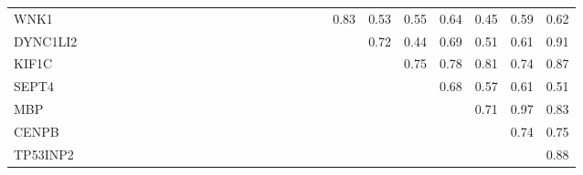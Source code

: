 \begin{longtable}{lrrrrrrrrrrrrrrrrrrrrrrrrrr}
WNK1     &              &             &            &              &              &            &            &            &            &              &               &             &             &              &             &                &                &            &            &           0.83 &        0.53 &        0.55 &      0.64 &        0.45 &           0.59 &        0.62 \\
DYNC1LI2 &              &             &            &              &              &            &            &            &            &              &               &             &             &              &             &                &                &            &            &                &        0.72 &        0.44 &      0.69 &        0.51 &           0.61 &        0.91 \\
KIF1C    &              &             &            &              &              &            &            &            &            &              &               &             &             &              &             &                &                &            &            &                &             &        0.75 &      0.78 &        0.81 &           0.74 &        0.87 \\
SEPT4    &              &             &            &              &              &            &            &            &            &              &               &             &             &              &             &                &                &            &            &                &             &             &      0.68 &        0.57 &           0.61 &        0.51 \\
MBP      &              &             &            &              &              &            &            &            &            &              &               &             &             &              &             &                &                &            &            &                &             &             &           &        0.71 &           0.97 &        0.83 \\
CENPB    &              &             &            &              &              &            &            &            &            &              &               &             &             &              &             &                &                &            &            &                &             &             &           &             &           0.74 &        0.75 \\
TP53INP2 &              &             &            &              &              &            &            &            &            &              &               &             &             &              &             &                &                &            &            &                &             &             &           &             &                &        0.88 \\
\end{longtable}


